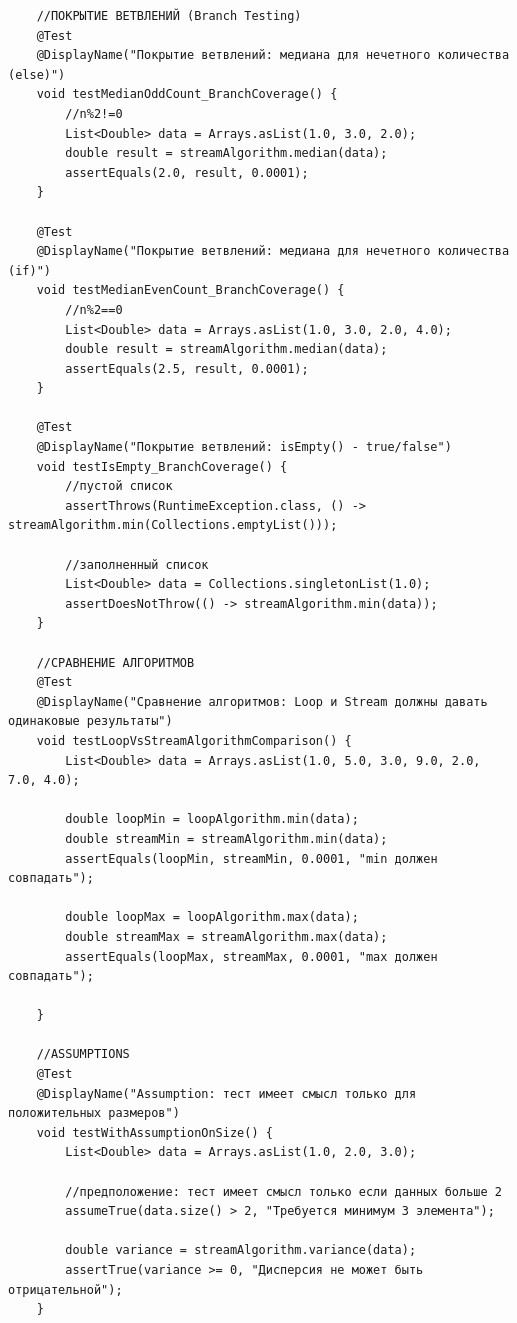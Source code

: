 \begin{verbatim}
    //ПОКРЫТИЕ ВЕТВЛЕНИЙ (Branch Testing)
    @Test
    @DisplayName("Покрытие ветвлений: медиана для нечетного количества (else)")
    void testMedianOddCount_BranchCoverage() {
        //n%2!=0
        List<Double> data = Arrays.asList(1.0, 3.0, 2.0);
        double result = streamAlgorithm.median(data);
        assertEquals(2.0, result, 0.0001);
    }

    @Test
    @DisplayName("Покрытие ветвлений: медиана для нечетного количества (if)")
    void testMedianEvenCount_BranchCoverage() {
        //n%2==0
        List<Double> data = Arrays.asList(1.0, 3.0, 2.0, 4.0);
        double result = streamAlgorithm.median(data);
        assertEquals(2.5, result, 0.0001);
    }

    @Test
    @DisplayName("Покрытие ветвлений: isEmpty() - true/false")
    void testIsEmpty_BranchCoverage() {
        //пустой список
        assertThrows(RuntimeException.class, () -> streamAlgorithm.min(Collections.emptyList()));

        //заполненный список
        List<Double> data = Collections.singletonList(1.0);
        assertDoesNotThrow(() -> streamAlgorithm.min(data));
    }

    //СРАВНЕНИЕ АЛГОРИТМОВ
    @Test
    @DisplayName("Сравнение алгоритмов: Loop и Stream должны давать одинаковые результаты")
    void testLoopVsStreamAlgorithmComparison() {
        List<Double> data = Arrays.asList(1.0, 5.0, 3.0, 9.0, 2.0, 7.0, 4.0);

        double loopMin = loopAlgorithm.min(data);
        double streamMin = streamAlgorithm.min(data);
        assertEquals(loopMin, streamMin, 0.0001, "min должен совпадать");

        double loopMax = loopAlgorithm.max(data);
        double streamMax = streamAlgorithm.max(data);
        assertEquals(loopMax, streamMax, 0.0001, "max должен совпадать");

    }

    //ASSUMPTIONS
    @Test
    @DisplayName("Assumption: тест имеет смысл только для положительных размеров")
    void testWithAssumptionOnSize() {
        List<Double> data = Arrays.asList(1.0, 2.0, 3.0);

        //предположение: тест имеет смысл только если данных больше 2
        assumeTrue(data.size() > 2, "Требуется минимум 3 элемента");

        double variance = streamAlgorithm.variance(data);
        assertTrue(variance >= 0, "Дисперсия не может быть отрицательной");
    }


\end{verbatim}
